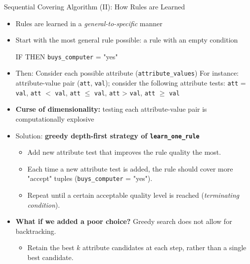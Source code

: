 \begin{frame}{Sequential Covering Algorithm (II): How Rules are Learned}
	\begin{itemize}
		\item Rules are learned in a \textit{general-to-specific} manner
		\item Start with the most general rule possible: a rule with an empty condition
		      \begin{center}
			      IF THEN \texttt{buys\_computer} = "yes"
		      \end{center}
		\item Then: Consider each possible attribute (\texttt{attribute\_values})\newline
		      For instance: attribute-value pair (\texttt{att}, \texttt{val}); consider the following attribute tests:\newline
		      \texttt{att} = \texttt{val}, \texttt{att} $<$ \texttt{val}, \texttt{att} $\leq$ \texttt{val}, \texttt{att} > \texttt{val}, \texttt{att} $\geq$ \texttt{val}
		\item \textbf{Curse of dimensionality:} testing each attribute-value pair is computationally explosive
		\item Solution: \textbf{greedy depth-first strategy of \texttt{learn\_one\_rule}}
		      \begin{itemize}
			      \item Add new attribute test that improves the rule quality the most.
			      \item Each time a new attribute test is added, the rule should cover more "accept" tuples (\texttt{buys\_computer} = "yes").
			      \item Repeat until a certain acceptable quality level is reached (\textit{terminating condition}).
		      \end{itemize}
		\item \textbf{What if we added a poor choice?} Greedy search does not allow for backtracking.
		      \begin{itemize}
			      \item Retain the best $k$ attribute candidates at each step, rather than a single best candidate.
		      \end{itemize}
	\end{itemize}
\end{frame}

